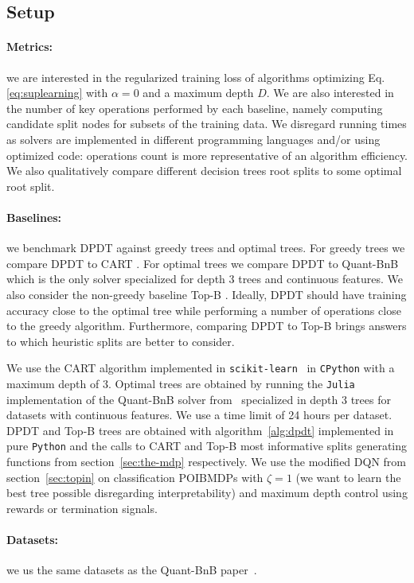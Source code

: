 \subsection{Setup}
\paragraph{Metrics:} we are interested in the regularized training loss of algorithms optimizing Eq.\ref{eq:suplearning} with $\alpha=0$ and a maximum depth $D$. We are also interested in the number of key operations performed by each baseline, namely computing candidate split nodes for subsets of the training data. We disregard running times as solvers are implemented in different programming languages and/or using optimized code: operations count is more representative of an algorithm efficiency. We also qualitatively compare different decision trees root splits to some optimal root split.
\paragraph{Baselines:} we benchmark DPDT against greedy trees and optimal trees. For greedy trees we compare DPDT to CART \cite{breiman1984classification}. For optimal trees we compare DPDT to Quant-BnB \cite{quantbnb} which is the only solver specialized for depth 3 trees and continuous features. We also consider the non-greedy baseline Top-B \cite{topk}. Ideally, DPDT should have training accuracy close to the optimal tree while performing a number of operations close to the greedy algorithm. Furthermore, comparing DPDT to Top-B brings answers to which heuristic splits are better to consider. 

We use the CART algorithm implemented in \texttt{scikit-learn}~\cite{scikit-learn} in \texttt{CPython} with a maximum depth of 3. Optimal trees are obtained by running the \texttt{Julia} implementation of the Quant-BnB solver from~\cite{quantbnb} specialized in depth 3 trees for datasets with continuous features. We use a time limit of 24 hours per dataset. 
DPDT and Top-B trees are obtained with algorithm~\ref{alg:dpdt} implemented in pure \texttt{Python} and the calls to CART and Top-B most informative splits generating functions from section~\ref{sec:the-mdp} respectively.
We use the modified DQN from section~\ref{sec:topin} on classification POIBMDPs with $\zeta=1$ (we want to learn the best tree possible disregarding interpretability) and maximum depth control using rewards or termination signals.
\paragraph{Datasets:} we us the same datasets as the Quant-BnB paper~\cite{quantbnb}.

